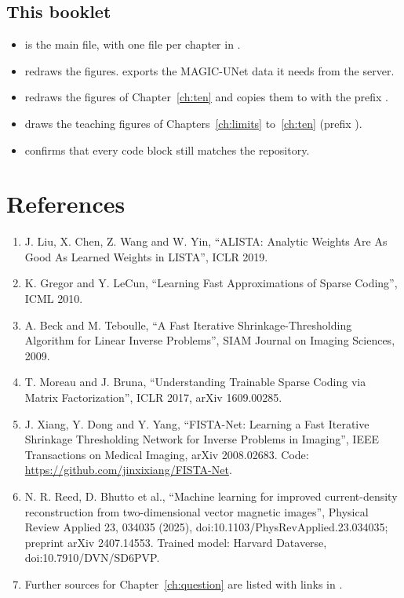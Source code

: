 \section*{This booklet}

\begin{itemize}
\item {} is the main file, with one file per chapter in .
\item {} redraws the figures.  exports the MAGIC-UNet data it needs from the server.
\item {} redraws the figures of Chapter~\ref{ch:ten} and copies them to
 with the prefix .
\item {} draws the teaching figures of Chapters~\ref{ch:limits}
to~\ref{ch:ten} (prefix ).
\item {} confirms that every code block still matches the repository.
\end{itemize}

\chapter{References}

\begin{enumerate}
\item J. Liu, X. Chen, Z. Wang and W. Yin, ``ALISTA: Analytic Weights Are As Good As Learned Weights in LISTA'',
ICLR 2019.
\item K. Gregor and Y. LeCun, ``Learning Fast Approximations of Sparse Coding'', ICML 2010.
\item A. Beck and M. Teboulle, ``A Fast Iterative Shrinkage-Thresholding Algorithm for Linear Inverse Problems'',
SIAM Journal on Imaging Sciences, 2009.
\item T. Moreau and J. Bruna, ``Understanding Trainable Sparse Coding via Matrix Factorization'', ICLR 2017,
arXiv 1609.00285.
\item J. Xiang, Y. Dong and Y. Yang, ``FISTA-Net: Learning a Fast Iterative Shrinkage Thresholding Network for
Inverse Problems in Imaging'', IEEE Transactions on Medical Imaging, arXiv 2008.02683. Code:
\url{https://github.com/jinxixiang/FISTA-Net}.
\item N. R. Reed, D. Bhutto et al., ``Machine learning for improved current-density reconstruction from two-dimensional
vector magnetic images'', Physical Review Applied 23, 034035 (2025), doi:10.1103/PhysRevApplied.23.034035; preprint
arXiv 2407.14553. Trained model: Harvard Dataverse, doi:10.7910/DVN/SD6PVP.
\item Further sources for Chapter~\ref{ch:question} are listed with links in .
\end{enumerate}
